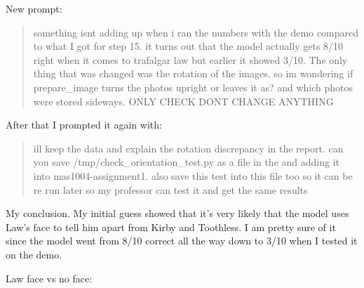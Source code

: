 \documentclass[11pt]{article}
\begin{document}
New prompt:
\begin{quote}
something isnt adding up when i ran the numbers with the demo compared to what
I got for step 15. it turns out that the model actually gets 8/10 right when
it comes to trafalgar law but earlier it showed 3/10. The only thing that was
changed was the rotation of the images. so im wondering if prepare\_image
turns the photos upright or leaves it as? and which photos were stored
sideways. ONLY CHECK DONT CHANGE ANYTHING
\end{quote}

After that I prompted it again with:
\begin{quote}
ill keep the data and explain the rotation discrepancy in the report. can you
save /tmp/check\_orientation\_test.py as a file in the and adding it into
mas1004-assignment1. also save this test into this file too so it can be re
run later so my professor can test it and get the same results
\end{quote}


My conclusion. My initial guess showed that it's very likely that the model
uses Law's face to tell him apart from Kirby and Toothless. I am pretty sure
of it since the model went from 8/10 correct all the way down to 3/10 when I
tested it on the demo.

Law face vs no face:
\end{document}
